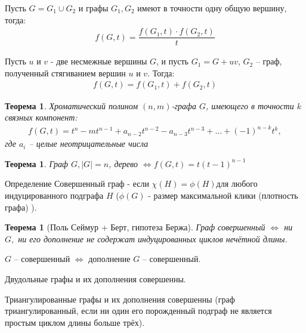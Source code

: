 \documentclass[a4paper,openany]{book}
\newcounter{TheoremCounter}
\newtheorem{theorem}[TheoremCounter]{Теорема}
\newenvironment{definition}
{\begin{statement}{Определение}}
    {\end{statement}}
\begin{document}
\begin{stm}
  Пусть $G = G_1 \cup G_2$ и графы $G_1, G_2$ имеют в точности одну общую
  вершину, тогда:
  \begin{align*}
    f(G, t)= \dfrac{f(G_1, t) \cdot f(G_2, t)}{t}
  \end{align*}
\end{stm}

\begin{stm}
  Пусть $u$ и $v$ - две несмежные вершины $G$, и пусть $G_1 = G + uv$, $G_2$ –
  граф, полученный стягиванием вершин $u$ и $v$. Тогда:
  \begin{align*}
    f(G, t)= f(G_1, t) + f(G_2, t)
  \end{align*}
\end{stm}

\begin{theorem}
  Хроматический полином $(n,m)$-графа $G$, имеющего в точности $k$ связных
  компонент:
  \begin{align*}
    f(G,t) = t^n -mt^{n-1} + a_{n-2}t^{n-2} - a_{n-3}t^{n-3} + \ldots
    + (-1)^{n-k}t^k,
  \end{align*}
  где $a_i$ – целые неотрицательные числа
\end{theorem}

\begin{theorem}
  Граф $G, |G| = n$, дерево $\Leftrightarrow f(G,t)=t(t - 1)^{n - 1}$
\end{theorem}

\begin{definition}
  Совершенный граф - если $\chi(H) = \phi(H)$для любого индуцированного
  подграфа $H$ ($\phi(G)$ - размер максимальной клики (плотность графа) ).
\end{definition}

\begin{theorem}[Поль Сеймур + Берт, гипотеза Бержа]
  Граф совершенный $\Leftrightarrow$ ни $G,$ ни его дополнение не содержат
  индуцированных циклов нечётной длины.
\end{theorem}

\begin{consequences}
  \item $G$ – совершенный $\Leftrightarrow$ дополнение $G$ – совершенный.
  \item Двудольные графы и их дополнения совершенны.
  \item Триангулированные графы и их дополнения совершенны (граф
  триангулированный, если ни один его порожденный подграф не является
  простым циклом длины больше трёх).
\end{consequences}
\end{document}
